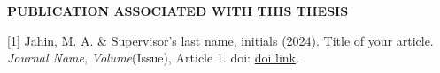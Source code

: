 \documentclass[a4paper,12pt,oneside]{book}
\newcommand{\HeadingR}[1]{%
{\large			%
\bfseries{#1}}}
\begin{document}
\newpage
{} \label{published}
\begin{center}
\HeadingR{\MakeUppercase{Publication Associated with this Thesis}}
\end{center}
[1] Jahin, M. A. \& Supervisor's last name, initials (2024). Title of your article. \textit{Journal Name}, \textit{Volume}(Issue), Article 1. doi: \href{https://doi.org/10.1038/s41598-023-45406-7}{doi link}.

% 
\end{document}
